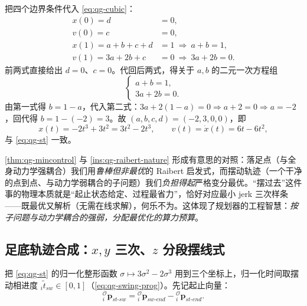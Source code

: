 \begin{derivation}\label{deriv:qg-coeff}
把四个边界条件代入 \cref{eq:qg-cubic}：
\[
  \begin{aligned}
  x(0)=d&=0,\\
  v(0)=c&=0,\\
  x(1)=a+b+c+d&=1\ \Rightarrow\ a+b=1,\\
  v(1)=3a+2b+c&=0\ \Rightarrow\ 3a+2b=0.
  \end{aligned}
\]
前两式直接给出 $d=0$、$c=0$。代回后两式，得关于 $a,b$ 的二元一次方程组
\[
  \begin{cases}
  a+b=1,\\
  3a+2b=0.
  \end{cases}
\]
由第一式得 $b=1-a$，代入第二式：$3a+2(1-a)=0\Rightarrow a+2=0\Rightarrow a=-2$，回代得 $b=1-(-2)=3$。故 $(a,b,c,d)=(-2,3,0,0)$，即
\[
  x(t)=-2t^3+3t^2=3t^2-2t^3,\qquad v(t)=\dot x(t)=6t-6t^2,
\]
与 \cref{eq:qg-st} 一致。
\end{derivation}

\begin{insight}[把“最优”用在负担得起的子问题上]\label{ins:qg-optimal-subproblem}
\cref{thm:qg-mincontrol} 与 \cref{ins:qg-raibert-nature} 形成有意思的对照：落足点（与全身动力学强耦合）我们用\emph{鲁棒但非最优}的 Raibert 启发式，而摆动轨迹（一个干净的点到点、与动力学弱耦合的子问题）我们\emph{负担得起}严格变分最优。“摆过去”这件事的物理本质就是“起止状态给定、过程最省力”，恰好对应最小 jerk 三次样条——既最优又解析（无需在线求解），何乐不为。这体现了规划器的工程智慧：\emph{按子问题与动力学耦合的强弱，分配最优化的算力预算}。
\end{insight}

\subsection{足底轨迹合成：$x,y$ 三次、$z$ 分段摆线式}
\label{subsec:qg-swing-synth}

把 \cref{eq:qg-st} 的归一化整形函数 $\sigma\mapsto3\sigma^2-2\sigma^3$ 用到三个坐标上，归一化时间取摆动相进度 ${}_i\tilde t_{sw}\in[0,1]$（\cref{eq:qg-swing-prog}）。先记起止向量\cite{yu2021quadruped}：
\begin{equation}
  {}_i^{\mathcal{O}}\boldsymbol{p}_{st\text{-}sw}={}_i^{\mathcal{O}}\boldsymbol{p}_{sw\text{-}end}-{}_i^{\mathcal{O}}\boldsymbol{p}_{st\text{-}end}.
  \label{eq:qg-stsw}
\end{equation}

